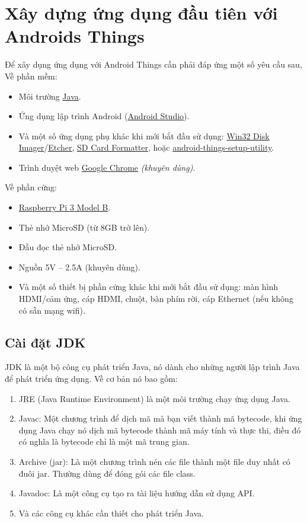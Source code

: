 \section{Xây dựng ứng dụng đầu tiên với Androids Things}
 Để xây dụng ứng dụng với Android Things cần phải đáp ứng một số yêu cầu sau,\\
 Về phần mềm:
 \begin{itemize}
 \item Môi trường \href{https://www.oracle.com/technetwork/java}{Java}.
 \item Ứng dụng lập trình Android (\href{https://developer.android.com/studio/}{Android Studio}).
 \item Và một số ứng dụng phụ khác khi mới bắt đầu sử dụng: 	\href{https://sourceforge.net/projects/win32diskimager/}{Win32 Disk Imager}/\href{https://www.balena.io/etcher/}{Etcher}, \href{https://www.sdcard.org/downloads/formatter_4/}{SD Card Formatter}, hoặc \href{https://partner.android.com/things/console/#/tools}{android-things-setup-utility}.
 \item Trình duyệt web \href{https://www.google.com/chrome}{Google Chrome} \textit{(khuyên dùng)}.
 \end{itemize}
 Về phần cứng:
 \begin{itemize}
 \item \href{https://www.raspberrypi.org/products/raspberry-pi-3-model-b/}{Raspberry Pi 3 Model B}.
 \item Thẻ nhớ MicroSD (từ 8GB trở lên).
 \item Đầu đọc thẻ nhớ MicroSD.
 \item Nguồn 5V – 2.5A (khuyên dùng). 
 \item Và một số thiết bị phần cứng khác khi mới bắt đầu sử dụng: màn hình HDMI/cảm ứng, cáp HDMI, chuột, bàn phím rời, cáp Ethernet (nếu không có sẵn mạng wifi).
 \end{itemize}
 \subsection{Cài đặt JDK}
 JDK là một bộ công cụ phát triển Java, nó dành cho những người lập trình Java để phát triển ứng dụng. Về cơ bản nó bao gồm:
 \begin{enumerate}
     \item JRE (Java Runtime Environment) là một môi trường chạy ứng dụng Java.
     \item Javac: Một chương trình để dịch mã mà bạn viết thành mã bytecode, khi ứng dụng Java chạy nó dịch mã bytecode thành mã máy tính và thực thi, điều đó có nghĩa là bytecode chỉ là một mã trung gian.
     \item Archive (jar): Là một chương trình nén các file thành một file duy nhất có đuôi jar. Thường dùng để đóng gói các file class.
     \item Javadoc: Là một công cụ tạo ra tài liệu hướng dẫn sử dụng API.
     \item Và các công cụ khác cần thiết cho phát triển Java.
 \end{enumerate}
 
